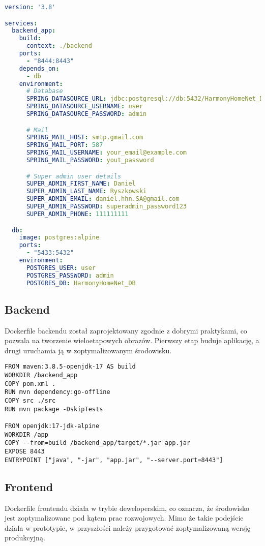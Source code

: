 \begin{lstlisting}[language=yaml, caption=Fragment pliku \texttt{docker-compose.yml}]
version: '3.8'

services:
  backend_app:
    build:
      context: ./backend
    ports:
      - "8444:8443"
    depends_on:
      - db
    environment:
      # Database
      SPRING_DATASOURCE_URL: jdbc:postgresql://db:5432/HarmonyHomeNet_DB
      SPRING_DATASOURCE_USERNAME: user
      SPRING_DATASOURCE_PASSWORD: admin

      # Mail
      SPRING_MAIL_HOST: smtp.gmail.com
      SPRING_MAIL_PORT: 587
      SPRING_MAIL_USERNAME: your_email@example.com
      SPRING_MAIL_PASSWORD: yout_password

      # Super admin user details
      SUPER_ADMIN_FIRST_NAME: Daniel
      SUPER_ADMIN_LAST_NAME: Ryszkowski
      SUPER_ADMIN_EMAIL: daniel.hhn.SA@gmail.com
      SUPER_ADMIN_PASSWORD: superadmin_password123
      SUPER_ADMIN_PHONE: 111111111

  db:
    image: postgres:alpine
    ports:
      - "5433:5432"
    environment:
      POSTGRES_USER: user
      POSTGRES_PASSWORD: admin
      POSTGRES_DB: HarmonyHomeNet_DB
\end{lstlisting}

\subsection{Backend}

Dockerfile backendu został zaprojektowany zgodnie z dobrymi praktykami, co pozwala na tworzenie wieloetapowych obrazów. Pierwszy etap buduje aplikację, a drugi uruchamia ją w zoptymalizowanym środowisku.

\begin{lstlisting}[language=docker, caption=Dockerfile backendu]
FROM maven:3.8.5-openjdk-17 AS build
WORKDIR /backend_app
COPY pom.xml .
RUN mvn dependency:go-offline
COPY src ./src
RUN mvn package -DskipTests

FROM openjdk:17-jdk-alpine
WORKDIR /app
COPY --from=build /backend_app/target/*.jar app.jar
EXPOSE 8443
ENTRYPOINT ["java", "-jar", "app.jar", "--server.port=8443"]
\end{lstlisting}

\subsection{Frontend}

Dockerfile frontendu działa w trybie deweloperskim, co oznacza, że środowisko jest zoptymalizowane pod kątem prac rozwojowych. Mimo że takie podejście działa w prototypie, w przyszłości należy przygotować zoptymalizowaną wersję produkcyjną.

